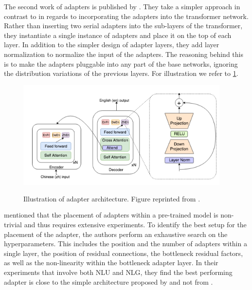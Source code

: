 The second work of adapters is published by . They take a simpler approach in contrast to  in regards to incorporating the adapters into the transformer network. Rather than inserting two serial adapters into the sub-layers of the transformer, they instantiate a single instance of adapters and place it on the top of each layer. In addition to the simpler design of adapter layers, they add layer normalization to normalize the input of the adapters. The reasoning behind this is to make the adapters pluggable into any part of the base networks, ignoring the distribution variations of the previous layers. For illustration we refer to \cref{img:ada_bapna}.

\begin{figure}[h]
    {\includegraphics[width=0.95\textwidth]{img/adapter_bapna.png}}
    \centering
    \caption{Illustration of adapter architecture. Figure reprinted from .}
    \label{img:ada_bapna}
\end{figure}

 mentioned that the placement of adapters within a pre-trained model is non-trivial and thus requires extensive experiments. To identify the best setup for the placement of the adapter, the authors perform an exhaustive search on the hyperparameters. This includes the position and the number of adapters within a single layer, the position of residual connections, the bottleneck residual factors, as well as the non-linearity within the bottleneck adapter layer. In their experiments that involve both NLU and NLG, they find the best performing adapter is close to the simple architecture proposed by  and not from .

